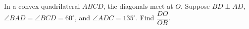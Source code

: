 In a convex quadrilateral $ABCD$, the diagonals meet at $O$. Suppose $BD\perp AD$, $\angle BAD=\angle BCD=60^\circ$, and $\angle ADC=135^\circ$. Find $\dfrac{DO}{OB}$.
